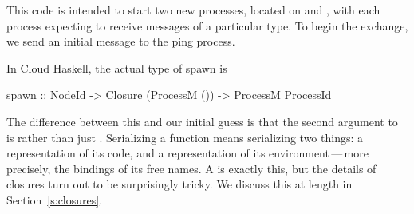 \documentclass[preprint]{sigplanconf}
\begin{document}
This code is intended to start two new processes, located on  and , with each process expecting to receive messages of a particular type. To begin the exchange, we send an initial  message to the ping process.

In Cloud Haskell, the actual type of spawn is
\begin{code}
spawn :: NodeId -> Closure (ProcessM ()) 
      		-> ProcessM ProcessId
\end{code}
\noindent
The difference between this and our initial guess is that the second argument to  is  rather than just .
Serializing a function means serializing two things: a representation of its code, and a representation of its environment\,---\,more precisely, the bindings of its free names.
A  is exactly this, but the details of closures turn out to be surprisingly tricky.
We discuss this at length in Section~\ref{s:closures}.
\label{s:closureForeshadow}
\end{document}
